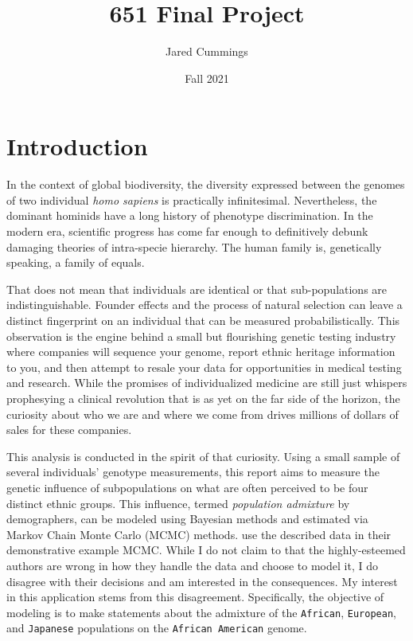\documentclass{article}
\title{651 Final Project}
\author{Jared Cummings}
\date{Fall 2021}
\begin{document}
\maketitle

\section{Introduction}

In the context of global biodiversity, the diversity expressed between the genomes of two individual \textit{homo sapiens} is practically infinitesimal. Nevertheless, the dominant hominids have a long history of phenotype discrimination. In the modern era, scientific progress has come far enough to definitively debunk damaging theories of intra-specie hierarchy. The human family is, genetically speaking, a family of equals.

That does not mean that individuals are identical or that sub-populations are indistinguishable. Founder effects and the process of natural selection can leave a distinct fingerprint on an individual that can be measured probabilistically. This observation is the engine behind a small but flourishing genetic testing industry where companies will sequence your genome, report ethnic heritage information to you, and then attempt to resale your data for opportunities in medical testing and research. While the promises of individualized medicine are still just whispers prophesying a clinical revolution that is as yet on the far side of the horizon, the curiosity about who we are and where we come from drives millions of dollars of sales for these companies.

This analysis is conducted in the spirit of that curiosity. Using a small sample of several individuals' genotype measurements, this report aims to measure the genetic influence of subpopulations on what are often perceived to be four distinct ethnic groups. This influence, termed \textit{population admixture} by demographers, can be modeled using Bayesian methods and estimated via Markov Chain Monte Carlo (MCMC) methods. \cite{efron2016CASI} use the described data in their demonstrative example MCMC. While I do not claim to that the highly-esteemed authors are wrong in how they handle the data and choose to model it, I do disagree with their decisions and am interested in the consequences. My interest in this application stems from this disagreement. Specifically, the objective of modeling is to make statements about the admixture of the \texttt{African}, \texttt{European}, and \texttt{Japanese} populations on the \texttt{African American} genome.
\end{document}
